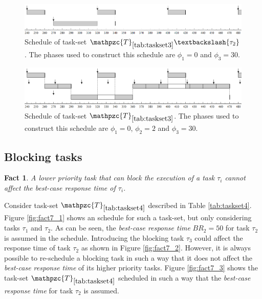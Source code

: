 \documentclass[fleqn]{article}
\newtheorem{fact}{Fact}
\begin{document}
\begin{figure}[H]
	\centering
	\includegraphics[width=0.9\linewidth]{figures/fact6_1}
	\caption{Schedule of task-set $\mathpzc{T}_{\ref{tab:taskset3}} \textbackslash \{\tau_2\}$. The phases used to construct this schedule are $\phi_1 = 0$ and $\phi_3 = 30$.}
	\label{fig:fact6_1}
\end{figure}

\begin{figure}[H]
	\centering
	\includegraphics[width=0.9\linewidth]{figures/fact6_2}
	\caption{Schedule of task-set $\mathpzc{T}_{\ref{tab:taskset3}}$. The phases used to construct this schedule are $\phi_1 = 0$, $\phi_2 = 2$ and $\phi_3 = 30$.}
	\label{fig:fact6_2}
\end{figure}

\subsection{Blocking tasks}

\begin{fact}
	A lower priority task that can block the execution of a task $\tau_i$ cannot affect the \textit{best-case response time} of $\tau_i$.
\end{fact}

Consider task-set $\mathpzc{T}_{\ref{tab:taskset4}}$ described in Table \ref{tab:taskset4}. Figure \ref{fig:fact7_1} shows an schedule for such a task-set, but only considering tasks $\tau_1$ and $\tau_2$. As can be seen, the \textit{best-case response time} $BR_2=50$ for task $\tau_2$ is assumed in the schedule. Introducing the blocking task $\tau_3$ could affect the response time of task $\tau_2$ as shown in Figure \ref{fig:fact7_2}. However, it is always possible to re-schedule a blocking task in such a way that it does not affect the \textit{best-case response time} of its higher priority tasks. Figure \ref{fig:fact7_3} shows the task-set $\mathpzc{T}_{\ref{tab:taskset4}}$ scheduled in such a way that the \textit{best-case response time} for task $\tau_2$ is assumed.
\end{document}
